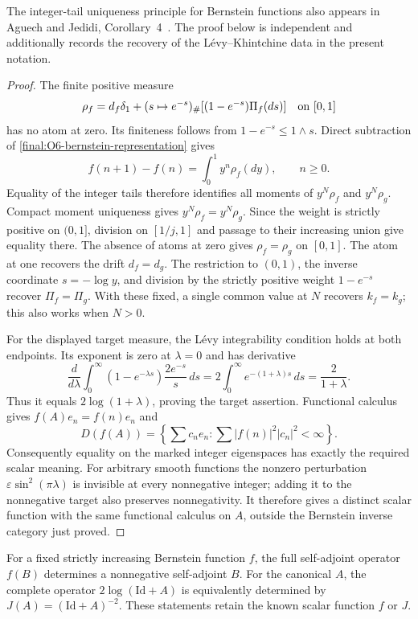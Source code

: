 The integer-tail uniqueness principle for Bernstein functions also appears
in Aguech and Jedidi, Corollary~4~\cite{AguechJedidi}.  The proof below is
independent and additionally records the recovery of the
L\'evy--Khintchine data in the present notation.

\begin{proof}
The finite positive measure
\[
 \rho_f=d_f\delta_1+
    (s\mapsto e^{-s})_\#[(1-e^{-s})\Pi_f(ds)]
 \quad\hbox{on }[0,1]
\]
has no atom at zero.  Its finiteness follows from
$1-e^{-s}\leq1\wedge s$.  Direct subtraction of
\eqref{final:O6-bernstein-representation} gives
\[
 f(n+1)-f(n)=\int_0^1y^n\rho_f(dy),\qquad n\geq0.
\]
Equality of the integer tails therefore identifies all moments of
$y^N\rho_f$ and $y^N\rho_g$.  Compact moment uniqueness gives
$y^N\rho_f=y^N\rho_g$.  Since the weight is strictly positive on
$(0,1]$, division on $[1/j,1]$ and passage to their increasing union
give equality there.  The absence of atoms at zero gives
$\rho_f=\rho_g$ on $[0,1]$.
The atom at one recovers the drift $d_f=d_g$.  The restriction to
$(0,1)$, the inverse coordinate $s=-\log y$, and division by the
strictly positive weight $1-e^{-s}$ recover
$\Pi_f=\Pi_g$.  With these fixed, a single common value at $N$
recovers $k_f=k_g$; this also works when $N>0$.

For the displayed target measure, the L\'evy integrability condition
holds at both endpoints.  Its exponent is zero at $\lambda=0$ and
has derivative
\[
 \frac{d}{d\lambda}\int_0^\infty
       (1-e^{-\lambda s})\frac{2e^{-s}}s\,ds
 =2\int_0^\infty e^{-(1+\lambda)s}\,ds
 =\frac2{1+\lambda}.
\]
Thus it equals $2\log(1+\lambda)$, proving the target assertion.
Functional calculus gives
$f(A)e_n=f(n)e_n$ and
\[
 D(f(A))=\left\{\sum c_ne_n:\sum|f(n)|^2|c_n|^2<\infty\right\}.
\]
Consequently equality on the marked integer eigenspaces has exactly
the required scalar meaning.  For arbitrary smooth functions the
nonzero perturbation $\varepsilon\sin^2(\pi\lambda)$ is invisible
at every nonnegative integer; adding it to the nonnegative target
also preserves nonnegativity.  It therefore gives a distinct scalar
function with the same functional calculus on $A$, outside the
Bernstein inverse category just proved.
\end{proof}

\begin{proposition}
\label{final:O6-functional-calculus}
For a fixed strictly increasing Bernstein function $f$, the full
self-adjoint operator $f(B)$ determines a nonnegative self-adjoint
$B$.  For the canonical $A$, the complete operator
$2\log(\mathrm{Id}+A)$ is equivalently determined by
$J(A)=(\mathrm{Id}+A)^{-2}$.
These statements retain the known scalar function $f$ or $J$.
\end{proposition}

